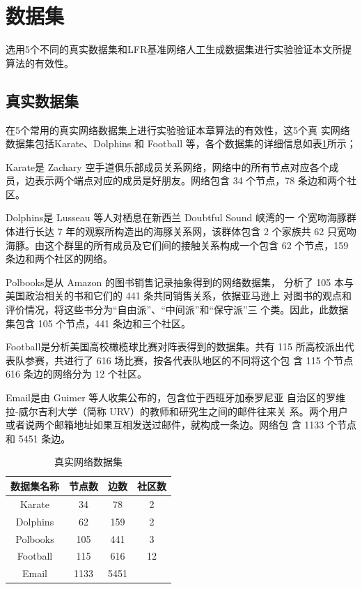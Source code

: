\section{数据集}
选用5个不同的真实数据集和LFR基准网络人工生成数据集进行实验验证本文所提算法的有效性。 


\subsection{真实数据集}
在5个常用的真实网络数据集上进行实验验证本章算法的有效性，这5个真
实网络数据集包括Karate、Dolphins 和 Football 等，各个数据集的详细信息如表\ref{tab:tab5-3}所示；

Karate是 Zachary 空手道俱乐部成员关系网络，网络中的所有节点对应各个成员，边表示两个端点对应的成员是好朋友。网络包含 34 个节点，78 条边和两个社区。 

Dolphins是 Lusseau 等人对栖息在新西兰 Doubtful Sound 峡湾的一
个宽吻海豚群体进行长达 7 年的观察所构造出的海豚关系网，该群体包含 2 个家族共 62 只宽吻海豚。由这个群里的所有成员及它们间的接触关系构成一个包含
62 个节点，159 条边和两个社区的网络。

Polbooks是从 Amazon 的图书销售记录抽象得到的网络数据集，
分析了 105 本与美国政治相关的书和它们的 441 条共同销售关系，依据亚马逊上
对图书的观点和评价情况，将这些书分为“自由派”、“中间派”和“保守派”三
个类。因此，此数据集包含 105 个节点，441 条边和三个社区。

Football是分析美国高校橄榄球比赛对阵表得到的数据集。共有 115
所高校派出代表队参赛，共进行了 616 场比赛，按各代表队地区的不同将这个包
含 115 个节点 616 条边的网络分为 12 个社区。 

Email是由 Guimer 等人收集公布的，包含位于西班牙加泰罗尼亚
自治区的罗维拉-威尔吉利大学（简称 URV）的教师和研究生之间的邮件往来关
系。两个用户或者说两个邮箱地址如果互相发送过邮件，就构成一条边。网络包
含 1133 个节点和 5451 条边。

\begin{table}
  \centering
  \caption{真实网络数据集} \label{tab:tab5-3}
  \begin{tabular*}{0.9\textwidth}{@{\extracolsep{\fill}}cccc}
  \toprule
    数据集名称		&节点数   &边数   &社区数\\
  \midrule
    Karate  &34 &78 &2\\
    Dolphins	&62 &159  &2\\
    Polbooks  &105  &441  &3\\
    Football  &115  &616  &12\\
    Email     &1133 &5451 \\
  \bottomrule
  \end{tabular*}
\end{table}

